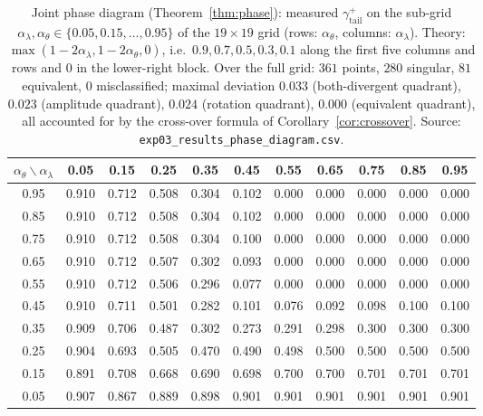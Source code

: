 \documentclass[11pt,reqno]{amsart}
\theoremstyle{plain}
\theoremstyle{definition}
\theoremstyle{remark}
\numberwithin{equation}{section}
\newcommand{\gtail}{\gamma_{\mathrm{tail}}}
\begin{document}
\begin{table}[p]
\centering\footnotesize\setlength{\tabcolsep}{4pt}
\caption{Joint phase diagram (Theorem~\ref{thm:phase}): measured $\gtail^+$ on the sub-grid $\alpha_\lambda,\alpha_\theta\in\{0.05,0.15,\dots,0.95\}$ of the $19\times19$ grid (rows: $\alpha_\theta$, columns: $\alpha_\lambda$). Theory: $\max(1-2\alpha_\lambda,1-2\alpha_\theta,0)$, i.e.\ $0.9,0.7,0.5,0.3,0.1$ along the first five columns and rows and $0$ in the lower-right block. Over the full grid: $361$ points, $280$ singular, $81$ equivalent, $0$ misclassified; maximal deviation $0.033$ (both-divergent quadrant), $0.023$ (amplitude quadrant), $0.024$ (rotation quadrant), $0.000$ (equivalent quadrant), all accounted for by the cross-over formula of Corollary~\ref{cor:crossover}. Source: \texttt{exp03\_results\_phase\_diagram.csv}.}
\label{tab:phase}
\begin{tabular}{@{}c|cccccccccc@{}}
\toprule
$\alpha_\theta\backslash\alpha_\lambda$ & 0.05 & 0.15 & 0.25 & 0.35 & 0.45 & 0.55 & 0.65 & 0.75 & 0.85 & 0.95 \\
\midrule
0.95 & 0.910 & 0.712 & 0.508 & 0.304 & 0.102 & 0.000 & 0.000 & 0.000 & 0.000 & 0.000 \\
0.85 & 0.910 & 0.712 & 0.508 & 0.304 & 0.102 & 0.000 & 0.000 & 0.000 & 0.000 & 0.000 \\
0.75 & 0.910 & 0.712 & 0.508 & 0.304 & 0.100 & 0.000 & 0.000 & 0.000 & 0.000 & 0.000 \\
0.65 & 0.910 & 0.712 & 0.507 & 0.302 & 0.093 & 0.000 & 0.000 & 0.000 & 0.000 & 0.000 \\
0.55 & 0.910 & 0.712 & 0.506 & 0.296 & 0.077 & 0.000 & 0.000 & 0.000 & 0.000 & 0.000 \\
0.45 & 0.910 & 0.711 & 0.501 & 0.282 & 0.101 & 0.076 & 0.092 & 0.098 & 0.100 & 0.100 \\
0.35 & 0.909 & 0.706 & 0.487 & 0.302 & 0.273 & 0.291 & 0.298 & 0.300 & 0.300 & 0.300 \\
0.25 & 0.904 & 0.693 & 0.505 & 0.470 & 0.490 & 0.498 & 0.500 & 0.500 & 0.500 & 0.500 \\
0.15 & 0.891 & 0.708 & 0.668 & 0.690 & 0.698 & 0.700 & 0.700 & 0.701 & 0.701 & 0.701 \\
0.05 & 0.907 & 0.867 & 0.889 & 0.898 & 0.901 & 0.901 & 0.901 & 0.901 & 0.901 & 0.901 \\
\bottomrule
\end{tabular}
\end{table}
\end{document}
